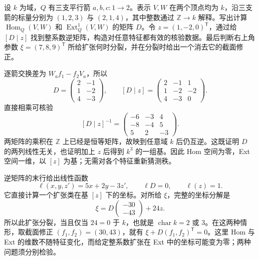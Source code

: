 \begin{optionalexercise}\label{b5:ex:09-integral-elimination-certificate}
	设 \(k\) 为域，\(Q\) 有三支平行箭 \(a,b,c:1\to2\)。表示 \(V,W\) 在两个顶点均为 \(k\)，沿三支箭的标量分别为 \((1,2,3)\) 与 \((2,1,4)\)，其中整数通过 \(\mathbb Z\to k\) 解释。写出计算 \(\operatorname{Hom}_Q(V,W)\) 和 \(\operatorname{Ext}^1_Q(V,W)\) 的矩阵 \(D\)。令 \(z=(1,-2,0)^{\mathsf T}\)，通过给 \([D\mid z]\) 找到整系数逆矩阵，构造对任意特征都有效的核验数据。最后判断右上角参数 \(\xi=(7,8,9)^{\mathsf T}\) 所给扩张何时分裂，并在分裂时给出一个消去它的截面修正。
\end{optionalexercise}
\begin{solution}
	逐箭交换差为 \(W_af_1-f_2V_a\)，所以
	\[
		D=\begin{pmatrix}2&-1\\1&-2\\4&-3\end{pmatrix},\qquad
		[D\mid z]=\begin{pmatrix}2&-1&1\\1&-2&-2\\4&-3&0\end{pmatrix}.
	\]
	直接相乘可核验
	\[
		[D\mid z]^{-1}=
		\begin{pmatrix}-6&-3&4\\-8&-4&5\\5&2&-3\end{pmatrix}.
	\]
	两矩阵的乘积在 \(\mathbb Z\) 上已经是恒等矩阵，故映到任意域 \(k\) 后仍互逆。这既证明 \(D\) 的两列线性无关，也证明加上 \(z\) 后得到 \(k^3\) 的一组基。因此 Hom 空间为零，Ext 空间一维，以 \([z]\) 为基；无需对各个特征重新猜测秩。

	逆矩阵的末行给出线性函数
	\[
		\ell(x,y,z')=5x+2y-3z',\qquad \ell D=0,\qquad \ell(z)=1.
	\]
	它直接计算一个扩张类在基 \([z]\) 下的坐标。对所给 \(\xi\)，完整的坐标分解是
	\[
		\xi=D\begin{pmatrix}-30\\-43\end{pmatrix}+24z.
	\]
	所以此扩张分裂，当且仅当 \(24=0\) 于 \(k\)，也就是 \(\operatorname{char}k=2\) 或 \(3\)。在这两种情形，取截面修正 \((f_1,f_2)=(30,43)\)，就有 \(\xi+D(f_1,f_2)^{\mathsf T}=0\)。这里 Hom 与 Ext 的维数不随特征变化，而给定整系数扩张在 Ext 中的坐标可能变为零；两种问题须分别检验。
\end{solution}
